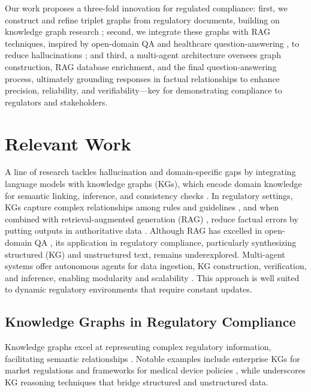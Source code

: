 \documentclass{article}
\begin{document}
Our work proposes a three-fold innovation for regulated compliance: first, we construct and refine triplet graphs from regulatory documents, building on knowledge graph research \cite{Nickel2015}; second, we integrate these graphs with RAG techniques, inspired by open-domain QA \cite{Lewis2021} and healthcare question-answering \cite{Yang2025}, to reduce hallucinations \cite{Ji2024}; and third, a multi-agent architecture oversees graph construction, RAG database enrichment, and the final question-answering process, ultimately grounding responses in factual relationships to enhance precision, reliability, and verifiability—key for demonstrating compliance to regulators and stakeholders.

\section{Relevant Work}
A line of research tackles hallucination and domain-specific gaps by integrating language models with knowledge graphs (KGs), which encode domain knowledge for semantic linking, inference, and consistency checks \cite{Hogan2021,Nickel2015,Chen2020}. In regulatory settings, KGs capture complex relationships among rules and guidelines \cite{Chattoraj2024}, and when combined with retrieval-augmented generation (RAG) \cite{Lewis2021}, reduce factual errors by putting outputs in authoritative data \cite{Li2024}. Although RAG has excelled in open-domain QA \cite{Lewis2021,Karpukhin20}, its application in regulatory compliance, particularly synthesizing structured (KG) and unstructured text, remains underexplored. Multi-agent systems \cite{Shoham08,Wooldridge09} offer autonomous agents for data ingestion, KG construction, verification, and inference, enabling modularity and scalability \cite{Weiss00,Zygmunt13}. This approach is well suited to dynamic regulatory environments that require constant updates.

\subsection{Knowledge Graphs in Regulatory Compliance} Knowledge graphs excel at representing complex regulatory information, facilitating semantic relationships \cite{Hogan2021}. Notable examples include enterprise KGs for market regulations \cite{Ershov23} and frameworks for medical device policies \cite{Chattoraj2024}, while \cite{Xiang25} underscores KG reasoning techniques that bridge structured and unstructured data.
\end{document}
